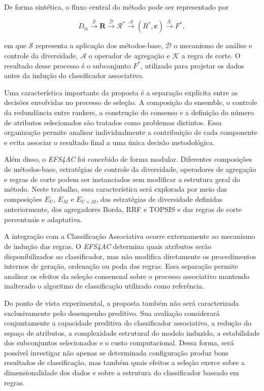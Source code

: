De forma sintética, o fluxo central do método pode ser representado por

\begin{equation}
    D_{\mathrm{tr}}
    \xrightarrow{\mathcal{S}}
    \mathbf{R}
    \xrightarrow{\mathcal{D}}
    \mathcal{R}^{*}
    \xrightarrow{\mathcal{A}}
    \left(R^{*},\mathbf{c}\right)
    \xrightarrow{\mathcal{K}}
    F^{*},
    \label{eq:sintese-final-ac-efs}
\end{equation}

em que $\mathcal{S}$ representa a aplicação dos métodos-base,
$\mathcal{D}$ o mecanismo de análise e controle da diversidade,
$\mathcal{A}$ o operador de agregação e $\mathcal{K}$ a regra de corte. O
resultado desse processo é o subconjunto $F^{*}$, utilizado para projetar os
dados antes da indução do classificador associativo.

Uma característica importante da proposta é a separação explícita entre as
decisões envolvidas no processo de seleção. A composição do ensemble, o
controle da redundância entre rankers, a construção do consenso e a definição
do número de atributos selecionados são tratados como problemas distintos.
Essa organização permite analisar individualmente a contribuição de cada
componente e evita associar o resultado final a uma única decisão metodológica.

Além disso, o \textit{EFS4AC} foi concebido de forma modular. Diferentes
composições de métodos-base, estratégias de controle da diversidade,
operadores de agregação e regras de corte podem ser instanciados sem modificar
a estrutura geral do método. Neste trabalho, essa característica será
explorada por meio das composições $E_U$, $E_M$ e $E_{U+M}$, das estratégias
de diversidade definidas anteriormente, dos agregadores Borda, RRF e TOPSIS e
das regras de corte percentuais e adaptativa.

A integração com a Classificação Associativa ocorre externamente ao mecanismo
de indução das regras. O \textit{EFS4AC} determina quais atributos serão
disponibilizados ao classificador, mas não modifica diretamente os
procedimentos internos de geração, ordenação ou poda das regras. Essa
separação permite analisar os efeitos da seleção consensual sobre o processo
associativo mantendo inalterado o algoritmo de classificação utilizado como
referência.

Do ponto de vista experimental, a proposta também não será caracterizada
exclusivamente pelo desempenho preditivo. Sua avaliação considerará
conjuntamente a capacidade preditiva do classificador associativo, a redução
do espaço de atributos, a complexidade estrutural do modelo induzido, a
estabilidade dos subconjuntos selecionados e o custo computacional. Dessa
forma, será possível investigar não apenas se determinada configuração produz
bons resultados de classificação, mas também quais efeitos a seleção exerce
sobre a dimensionalidade dos dados e sobre a estrutura do classificador
baseado em regras.

